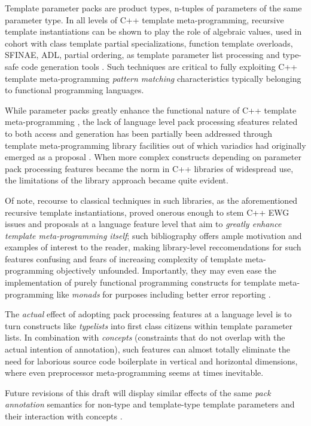\p Template parameter packs are product types, n-tuples of parameters of the same parameter type.
In all levels of C++ template meta-programming, recursive template instantiations can be shown to play the role of algebraic values, used in cohort with class template partial specializations, function template overloads, SFINAE, ADL, partial ordering, as template parameter list processing and type-safe code generation tools \cite{Munoz2008,JarviWL03,Abrahams2004,Alexandrescu2001}.
Such techniques are critical to fully exploiting C++ template meta-programming \textit{pattern matching} characteristics typically belonging to functional programming languages.

\p While parameter packs greatly enhance the functional nature of C++ template meta-programming \cite{Alexandrescu2012}, the lack of language level pack processing sfeatures related to both access and generation has been partially been addressed through template meta-programming library facilities out of which variadics had originally emerged as a proposal \cite{Czarnecki2000,Alexandrescu2001,Abrahams2004,Gregor2006,Gregor2008,Gregor2008a}.
When more complex constructs depending on parameter pack processing features became the norm in C++ libraries of widespread use, the limitations of the library approach became quite evident.

\p Of note, recourse to classical techniques in such libraries, as the aforementioned recursive template instantiations, proved onerous enough to stem C++ EWG issues and proposals at a language feature level \cite{Abrahams2012,Middleditch2013,Wakely2013,Wakely2013a} that aim to \textit{greatly enhance template meta-programming itself}; such bibliography offers ample motivation and examples of interest to the reader, making library-level reccomendations for such features confusing and fears of increasing complexity of template meta-programming objectively unfounded.
Importantly, they may even ease the implementation of purely functional programming constructs for template meta-programming like \textit{monads} \cite{Porkolab2010,Sinkovich2013} for purposes including better error reporting \cite{Sinkovich2013}.

\p The \textit{actual} effect of adopting pack processing features at a language level is to turn constructs like \textit{typelists} \cite{Czarnecki2000,Alexandrescu2001,Abrahams2004} into first class citizens within template parameter lists.
In combination with \textit{concepts} \cite{Stroustrup2012,Sutton2013} (constraints that do not overlap with the actual intention of annotation), such features can almost totally eliminate the need for laborious source code boilerplate in vertical and horizontal dimensions, where even preprocessor meta-programming seems at times inevitable.

\p Future revisions of this draft will display similar effects of the same \textit{pack annotation} semantics for non-type and template-type template parameters and their interaction with concepts \cite{Stroustrup2012,Sutton2013}.
\newpage

